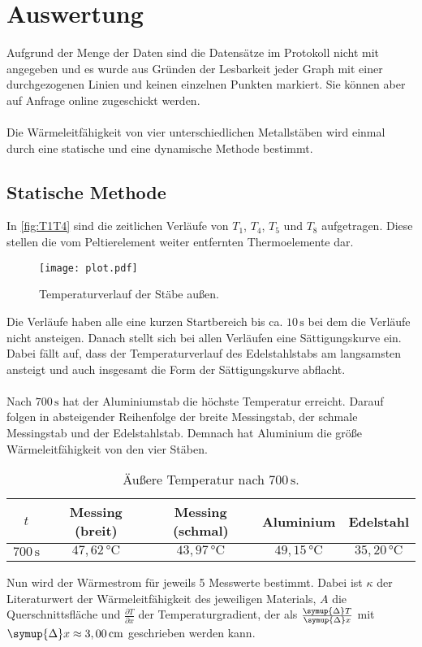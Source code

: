 \section{Auswertung}
\label{sec:Auswertung}
Aufgrund der Menge der Daten sind die Datensätze im Protokoll nicht mit angegeben und es wurde aus Gründen der Lesbarkeit jeder Graph mit einer durchgezogenen Linien
und keinen einzelnen Punkten markiert.
Sie können aber auf Anfrage online zugeschickt werden.\\
\\
Die Wärmeleitfähigkeit von vier unterschiedlichen Metallstäben wird einmal durch eine statische und
eine dynamische Methode bestimmt.

\subsection{Statische Methode}
\label{sec:stat}

In \autoref{fig:T1T4} sind die zeitlichen Verläufe von $T_1$, $T_4$, $T_5$ und $T_8$ aufgetragen. Diese stellen die vom Peltierelement weiter
entfernten Thermoelemente dar.

\begin{figure}[h]
  \centering
  \texttt{[image: plot.pdf]}
  \caption{Temperaturverlauf der Stäbe außen.}
  \label{fig:T1T4}
\end{figure}
Die Verläufe haben alle eine kurzen Startbereich bis ca. $10 \,\si{\second}$ bei dem die Verläufe nicht
ansteigen. Danach stellt sich bei allen Verläufen eine Sättigungskurve ein.
Dabei fällt auf, dass der Temperaturverlauf des Edelstahlstabs am langsamsten
ansteigt und auch insgesamt die Form der Sättigungskurve abflacht.\\
\\
Nach $700\,\si{\second}$ hat der Aluminiumstab die höchste Temperatur erreicht. Darauf folgen in absteigender Reihenfolge der breite Messingstab, der schmale Messingstab
und der Edelstahlstab. Demnach hat Aluminium die größe Wärmeleitfähigkeit von den vier Stäben.

\begin{table}[h]
  \centering
  \caption{Äußere Temperatur nach $700\,\si{\second}$.}
  \label{tab:700s}
  \begin{tabular}{c c c c c}
    \toprule
    $t$ & Messing (breit) & Messing (schmal) & Aluminium & Edelstahl \\
    \midrule
    $700\,\si{\second}$ & $47,62\,\si{\celsius}$ & $43,97\,\si{\celsius}$ & $49,15\,\si{\celsius}$ & $35,20\,\si{\celsius}$ \\
    \bottomrule
  \end{tabular}
\end{table}
Nun wird der Wärmestrom für jeweils 5 Messwerte bestimmt. Dabei ist $\kappa$ der Literaturwert der Wärmeleitfähigkeit des jeweiligen
Materials, $A$ die Querschnittsfläche und $\frac{\partial T}{\partial x}$ der Temperaturgradient, der als $\frac{\symup{\Delta} T}{\symup{\Delta} x}$
mit $\symup{\Delta}x \approx 3,00\,\si{\centi\meter}$ geschrieben werden kann.

